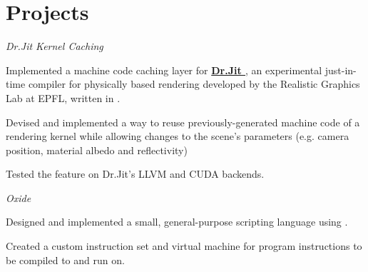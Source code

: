 \section*{Projects}
\begin{cventries}
  {\textit{Dr.Jit Kernel Caching}}
  {}
  {}
  {%
    \begin{cvitems}
	\item Implemented a machine code caching layer for \textbf{\href{https://rgl.epfl.ch/publications/Jakob2022DrJit}{Dr.Jit \faExternalLink*}}, an experimental just-in-time compiler for physically based rendering developed by the Realistic Graphics Lab at EPFL, written in .
		\item Devised and implemented a way to reuse previously-generated machine code of a rendering kernel while allowing changes to the scene's parameters (e.g. camera position, material albedo and reflectivity)
		\item Tested the feature on Dr.Jit's LLVM and CUDA backends.
    \end{cvitems}
  }
  {\textit{Oxide}}
  {}
  {}
  {%
    \begin{cvitems}
    \item Designed and implemented a small, general-purpose scripting language using .\textbf{}
    \item Created a custom instruction set and virtual machine for program instructions to be compiled to and run on.
    \end{cvitems}
  }

\end{cventries}
